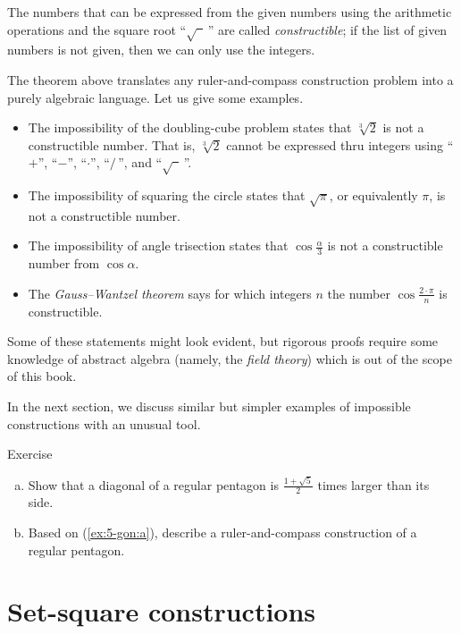 The numbers that can be expressed from the given numbers using the arithmetic operations and the square root ``$\sqrt{\phantom{a}}\,$'' are called \emph{constructible};
if the list of given numbers is not given, then we can only use the integers.

{\sloppy
The theorem above translates any ruler-and-compass construction problem into a purely algebraic language.
Let us give some examples.
\begin{itemize}
\item The impossibility of the doubling-cube problem states that $\sqrt[3]{2}$ is not a constructible number.
That is, $\sqrt[3]{2}$ cannot be expressed thru integers using
``$+$'', ``$-$'', ``$\cdot$'', ``$/\,$'', and ``$\sqrt{\phantom{a}}\,$''.

\item The impossibility of squaring the circle states that 
$\sqrt{\pi}$, or equivalently $\pi$, is not a constructible number.

\item The impossibility of angle trisection states that $\cos\tfrac\alpha3$ is not a constructible number from $\cos\alpha$.

\item The \emph{Gauss--Wantzel theorem} says for which integers $n$ the number 
$\cos\tfrac{2\cdot\pi}n$ is constructible.
\end{itemize} 
Some of these statements might look evident, 
but rigorous proofs require some knowledge of abstract algebra (namely, the \textit{field theory})
which is out of the scope of this book. 

}

In the next section, we discuss similar but simpler examples of impossible constructions with an unusual tool.

\begin{thm}{Exercise}\label{ex:5-gon}
\begin{enumerate}[(a)]
 \item\label{ex:5-gon:a} Show that a diagonal of a regular pentagon is $\tfrac{1+\sqrt5}2$ times larger than its side.
 \item\label{ex:5-gon:b} Based on (\ref{ex:5-gon:a}), describe a ruler-and-compass construction of a regular pentagon.
\end{enumerate}
\end{thm}

\section{Set-square constructions}

